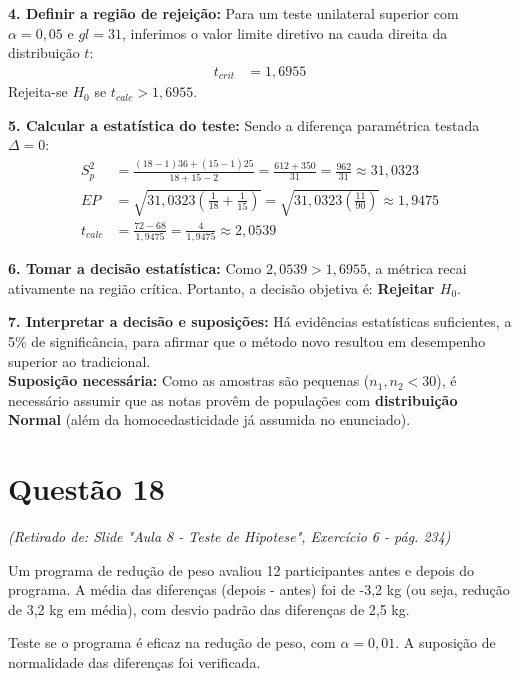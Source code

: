 \documentclass[12pt, a4paper]{article}
\begin{document}
\noindent \textbf{4. Definir a região de rejeição:}
Para um teste unilateral superior com $\alpha = 0{,}05$ e $gl = 31$, inferimos o valor limite diretivo na cauda direita da distribuição $t$:
\begin{align*}
t_{crit} &= \boxed{1{,}6955}
\end{align*}
Rejeita-se $H_0$ se $t_{calc} > 1{,}6955$.

\noindent \textbf{5. Calcular a estatística do teste:}
Sendo a diferença paramétrica testada $\Delta = 0$:
\begin{align*}
S^2_p &= \frac{(18-1)36 + (15-1)25}{18+15-2} = \frac{612 + 350}{31} = \frac{962}{31} \approx \boxed{31{,}0323} \\
EP &= \sqrt{31{,}0323 \left( \frac{1}{18} + \frac{1}{15} \right)} = \sqrt{31{,}0323 \left( \frac{11}{90} \right)} \approx \boxed{1{,}9475} \\
t_{calc} &= \frac{72 - 68}{1{,}9475} = \frac{4}{1{,}9475} \approx \boxed{2{,}0539}
\end{align*}

\noindent \textbf{6. Tomar a decisão estatística:}
Como $2{,}0539 > 1{,}6955$, a métrica recai ativamente na região crítica. Portanto, a decisão objetiva é: \textbf{Rejeitar $H_0$}.

\noindent \textbf{7. Interpretar a decisão e suposições:}
Há evidências estatísticas suficientes, a 5\% de significância, para afirmar 
que o método novo resultou em desempenho superior ao tradicional. \\
\textbf{Suposição necessária:} Como as amostras são pequenas ($n_1, n_2 < 30$), 
é necessário assumir que as notas provêm de populações com \textbf{distribuição 
Normal} (além da homocedasticidade já assumida no enunciado).

\section*{Questão 18}
\textit{(Retirado de: Slide "Aula 8 - Teste de Hipotese", Exercício 6 - pág. 234)}

Um programa de redução de peso avaliou 12 participantes antes e depois do programa. A média das diferenças (depois - antes) foi de -3,2 kg (ou seja, redução de 3,2 kg em média), com desvio padrão das diferenças de 2,5 kg. 

\medskip\noindent Teste se o programa é eficaz na redução de peso, com $\alpha = 0{,}01$. A suposição de normalidade das diferenças foi verificada.
\end{document}

